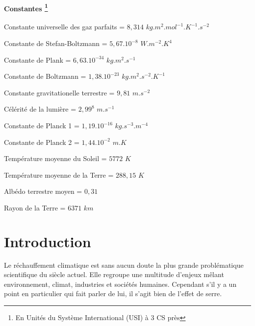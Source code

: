 \documentclass[a4paper, 12pt]{report} %
\begin{document}
\begin{description}
	\subsubsection*{Constantes \footnote{En Unités du Système International (USI) à 3 CS près}}
	\item[\boldmath{$R$}:] Constante universelle des gaz parfaits = $8,314$ $kg.m^2.mol^{-1}.K^{-1}.s^{-2}$
	\item[\boldmath{$\sigma$}:] Constante de Stefan-Boltzmann = $5,67.10^{-8}$ $W.m^{-2}.K^{4}$
	\item[\boldmath{$h$}:] Constante de Plank = $6,63.10^{-34}$ $kg.m^2.s^{-1}$
 	\item[\boldmath{$k_B$}:] Constante de Boltzmann = $1,38.10^{-23}$ $kg.m^2.s^{-2}.K^{-1}$
  	\item[\boldmath{$g$}:] Constante gravitationelle terrestre = $9,81$ $m.s^{-2}$
   	\item[\boldmath{$c_0$}:] Célérité de la lumière = $2,99^8$ $m.s^{-1}$
    \item[\boldmath{$C_1$}:] Constante de Planck 1 = $1,19.10^{-16}$ $kg.s^{-3}.m^{-4}$
    \item[\boldmath{$C_2$}:] Constante de Planck 2 = $1,44.10^{-2}$ $m.K$
    \item[\boldmath{$T_s$}:] Température moyenne du Soleil = $5 772$ $K$
    \item[\boldmath{$T_T$}:] Température moyenne de la Terre = $288,15$ $K$
	\item[\boldmath{$\bar{a_T}$}:] Albédo terrestre moyen = $0,31$
    \item[\boldmath{$R_T$}:] Rayon de la Terre = $6 371$ $km$
\end{description}


\newpage
\chapter*{Introduction}				

\indent Le réchauffement climatique est sans aucun doute la plus grande problématique 
scientifique du siècle actuel. Elle regroupe une multitude d'enjeux mêlant environnement,
climat, industries et sociétés humaines. Cependant s'il y a un point en particulier qui 
fait parler de lui, il s'agit bien de l'effet de serre. \vspace{\baselineskip}
\end{document}
